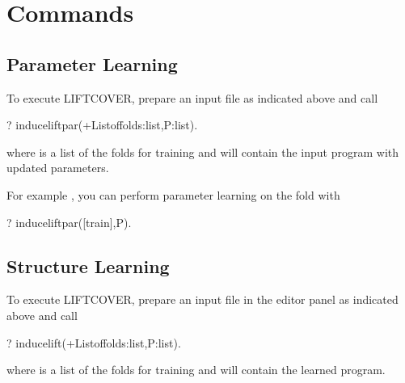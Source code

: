 \documentclass[letterpaper,10pt,english]{sphinxmanual}
\begin{document}
\section{Commands}
\label{\detokenize{index:commands}}

\subsection{Parameter Learning}
\label{\detokenize{index:parameter-learning}}
\sphinxAtStartPar
To execute LIFTCOVER, prepare an input file as indicated above and call

\begin{sphinxVerbatim}[commandchars=\\\{\}]
?\PYGZhy{} induce\PYGZus{}lift\PYGZus{}par(+List\PYGZus{}of\PYGZus{}folds:list,\PYGZhy{}P:list).
\end{sphinxVerbatim}

\sphinxAtStartPar
where  is a list of the folds for training and  will contain
the input program with updated parameters.

\sphinxAtStartPar
For example , you can perform parameter learning on the  fold with

\begin{sphinxVerbatim}[commandchars=\\\{\}]
?\PYGZhy{} induce\PYGZus{}lift\PYGZus{}par([train],P).
\end{sphinxVerbatim}


\subsection{Structure Learning}
\label{\detokenize{index:structure-learning}}
\sphinxAtStartPar
To execute LIFTCOVER, prepare an input file in the editor panel as indicated above and call

\begin{sphinxVerbatim}[commandchars=\\\{\}]
?\PYGZhy{} induce\PYGZus{}lift(+List\PYGZus{}of\PYGZus{}folds:list,\PYGZhy{}P:list).
\end{sphinxVerbatim}

\sphinxAtStartPar
where  is a list of the folds for training and  will contain the learned program.
\end{document}
